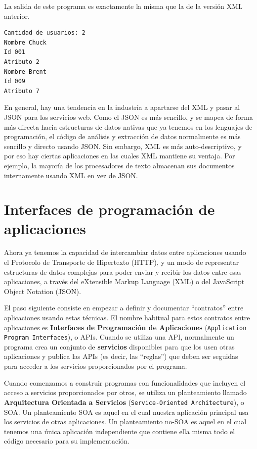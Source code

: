 La salida de este programa es exactamente la misma que la de la versión XML anterior.

\beforeverb
\begin{verbatim}
Cantidad de usuarios: 2
Nombre Chuck
Id 001
Atributo 2
Nombre Brent
Id 009
Atributo 7
\end{verbatim}
\afterverb
%
En general, hay una tendencia en la industria a apartarse del XML y pasar al JSON para
los servicios web. Como el JSON es más sencillo, y se mapea de forma más directa hacia
estructuras de datos nativas que ya tenemos en los lenguajes de programación, el código de
análisis y extracción de datos normalmente es más sencillo y directo usando JSON.
Sin embargo, XML es más auto-descriptivo, y por eso hay ciertas
aplicaciones en las cuales XML mantiene su ventaja. Por ejemplo, la mayoría de los
procesadores de texto almacenan sus documentos internamente usando XML en vez de JSON.

\section{Interfaces de programación de aplicaciones}

Ahora ya tenemos la capacidad de intercambiar datos entre aplicaciones usando el Protocolo
de Transporte de Hipertexto (HTTP), y un modo de representar estructuras de datos complejas
para poder enviar y recibir los datos entre esas aplicaciones, a través del eXtensible 
Markup Language (XML) o del JavaScript Object Notation (JSON).

El paso siguiente consiste en empezar a definir y documentar ``contratos'' entre
aplicaciones usando estas técnicas. El nombre habitual para estos
contratos entre aplicaciones es {\bf Interfaces de Programación
de Aplicaciones} ({\tt Application Program Interfaces}), o APIs. Cuando se utiliza una API, normalmente un programa
crea un conjunto de {\bf servicios} disponibles para que los usen otras aplicaciones
y publica las APIs (es decir, las ``reglas'') que deben ser seguidas para
acceder a los servicios proporcionados por el programa.

Cuando comenzamos a construir programas con funcionalidades que incluyen
el acceso a servicios proporcionados por otros,
se utiliza un planteamiento llamado {\bf Arquitectura Orientada a Servicios}
({\tt Service-Oriented Architecture}), o SOA.
Un planteamiento SOA es aquel en el cual nuestra aplicación principal usa los servicios
de otras aplicaciones. Un planteamiento no-SOA es aquel en el cual tenemos
una única aplicación independiente que contiene ella misma todo el código
necesario para su implementación.


